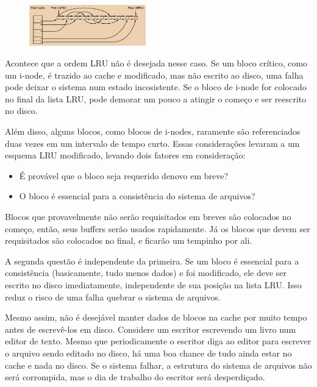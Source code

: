 \documentclass{article}
\begin{document}
\begin{figure}[h]
  \begin{center}
    \includegraphics[width=0.45\textwidth]{img/5-20.png}
  \end{center}
  \caption{}
  \label{fig:}
\end{figure}

Acontece que a ordem LRU não é desejada nesse caso. Se um bloco crítico, como um i-node, é trazido ao cache e modificado, mas não escrito ao disco, uma falha pode deixar o sistema num estado incosistente. Se o bloco de i-node for colocado no final da lista LRU, pode demorar um pouco a atingir o começo e ser reescrito no disco.

Além disso, alguns blocos, como blocos de i-nodes, raramente são referenciados duas vezes em um intervalo de tempo curto. Essas considerações levaram a um esquema LRU modificado, levando dois fatores em consideração:
\begin{itemize}
  \item É provável que o bloco seja requerido denovo em breve?
  \item O bloco é essencial para a consistência do sistema de arquivos?
\end{itemize}

Blocos que provavelmente não serão requisitados em breves são colocados no começo, então, seus buffers serão usados rapidamente. Já os blocos que devem ser requisitados são colocados no final, e ficarão um tempinho por ali.

A segunda questão é independente da primeira. Se um bloco é essencial para a consistência (basicamente, tudo menos dados) e foi modificado, ele deve ser escrito no disco imediatamente, independente de sua posição na lista LRU. Isso reduz o risco de uma falha quebrar o sistema de arquivos.

Mesmo assim, não é desejável manter dados de blocos na cache por muito tempo antes de escrevê-los em disco. Considere um escritor escrevendo um livro num editor de texto. Mesmo que periodicamente o escritor diga ao editor para escrever o arquivo sendo editado no disco, há uma boa chance de tudo ainda estar no cache e nada no disco. Se o sistema falhar, a estrutura do sistema de arquivos não será corrompida, mas o dia de trabalho do escritor será desperdiçado. 
\end{document}
